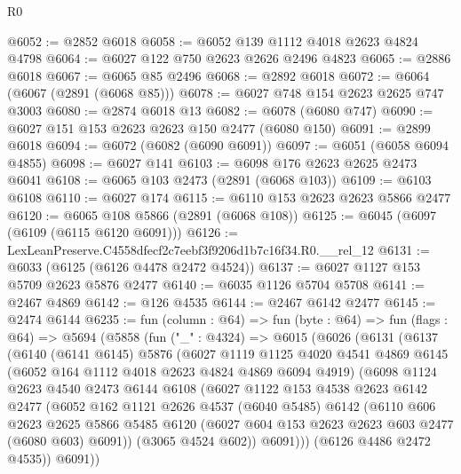 \begin{lexlean}{R0}
\begin{coremodule}
@6052 := @2852 @6018
@6058 := @6052 @139 @1112 @4018 @2623 @4824 @4798
@6064 := @6027 @122 @750 @2623 @2626 @2496 @4823
@6065 := @2886 @6018
@6067 := @6065 @85 @2496
@6068 := @2892 @6018
@6072 := @6064 (@6067 (@2891 (@6068 @85)))
@6078 := @6027 @748 @154 @2623 @2625 @747 @3003
@6080 := @2874 @6018 @13
@6082 := @6078 (@6080 @747)
@6090 := @6027 @151 @153 @2623 @2623 @150 @2477 (@6080 @150)
@6091 := @2899 @6018
@6094 := @6072 (@6082 (@6090 @6091))
@6097 := @6051 (@6058 @6094 @4855)
@6098 := @6027 @141
@6103 := @6098 @176 @2623 @2625 @2473 @6041
@6108 := @6065 @103 @2473 (@2891 (@6068 @103))
@6109 := @6103 @6108
@6110 := @6027 @174
@6115 := @6110 @153 @2623 @2623 @5866 @2477
@6120 := @6065 @108 @5866 (@2891 (@6068 @108))
@6125 := @6045 (@6097 (@6109 (@6115 @6120 @6091)))
@6126 := LexLeanPreserve.C4558dfecf2c7eebf3f9206d1b7c16f34.R0.__rel_12
@6131 := @6033 (@6125 (@6126 @4478 @2472 @4524))
@6137 := @6027 @1127 @153 @5709 @2623 @5876 @2477
@6140 := @6035 @1126 @5704 @5708
@6141 := @2467 @4869
@6142 := @126 @4535
@6144 := @2467 @6142 @2477
@6145 := @2474 @6144
@6235 := fun (column : @64) =>
  fun (byte : @64) =>
  fun (flags : @64) =>
  @5694
    (@5858
      (fun ("_" : @4324) =>
      @6015
        (@6026
          (@6131
            (@6137
              (@6140
                (@6141 @6145)
                @5876
                (@6027
                  @1119
                  @1125
                  @4020
                  @4541
                  @4869
                  @6145
                  (@6052 @164 @1112 @4018 @2623 @4824 @4869 @6094 @4919)
                  (@6098
                    @1124
                    @2623
                    @4540
                    @2473
                    @6144
                    @6108
                    (@6027
                      @1122
                      @153
                      @4538
                      @2623
                      @6142
                      @2477
                      (@6052
                        @162
                        @1121
                        @2626
                        @4537
                        (@6040 @5485)
                        @6142
                        (@6110
                          @606
                          @2623
                          @2625
                          @5866
                          @5485
                          @6120
                          (@6027 @604 @153 @2623 @2623 @603 @2477 (@6080 @603) @6091))
                        (@3065 @4524 @602))
                      @6091)))
                (@6126 @4486 @2472 @4535))
              @6091))

\end{coremodule}
\end{lexlean}
